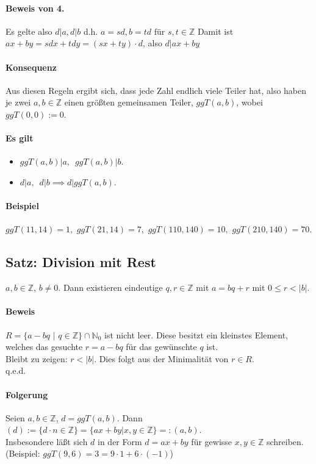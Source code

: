 \documentclass[14pt,a4paper]{article}
\newcommand{\Z}{\ensuremath{\mathbb{Z}}}
\begin{document}
			\paragraph{Beweis von 4.}
				Es gelte also $d|a, d|b$ d.h. $a=sd, b=td \text{ für } s,t \in \mathbb{Z}$
				Damit ist $ax+by=sdx+tdy=(sx+ty)\cdot d$, also $d|ax+by$

			\paragraph{Konsequenz}
				Aus diesen Regeln ergibt sich, dass jede Zahl endlich viele Teiler hat, also haben je zwei $a,b \in \mathbb{Z}$ einen größten gemeinsamen Teiler, $ggT(a,b)$, wobei $ggT(0,0) := 0$.

			\paragraph{Es gilt}
				\begin{itemize}
					\item$ggT(a,b) | a,\,\,\, ggT(a,b) | b$.
					\item $d|a,\,\,\,d|b \implies d|ggT(a,b)$.
				\end{itemize}

			\paragraph{Beispiel}
				$ggT(11,14) = 1,\,\, ggT(21,14) = 7,\,\, ggT(110, 140) = 10,\,\, ggT(210, 140) = 70$.

		\subsection{Satz: Division mit Rest}
			$ a,b \in \mathbb{Z},\,b \neq 0 $. Dann existieren eindeutige $ q,r \in \mathbb{Z} $ mit $ a = bq + r $ mit $ 0 \leq r < |b| $.
			\paragraph{Beweis}
				$ R = \{ a - bq\,\,|\,\,q \in \mathbb{Z} \} \cap \mathbb{N}_0 $ ist nicht leer.
				Diese besitzt ein kleinstes Element, welches das gesuchte $ r = a - bq $ für das gewünschte $q$ ist.\\
				Bleibt zu zeigen: $r < |b|$. Dies folgt aus der Minimalität von $r \in R$. \\
				q.e.d.
			\paragraph{Folgerung}
				Seien $ a,b \in \Z$, $d=ggT(a,b) $. Dann $ (d) := \{d \cdot n \in \Z\} = \{ax + by | x,y \in \Z \} =: (a,b) $. \\
				Insbesondere läßt sich $d$ in der Form $d = ax + by$ für gewisse $ x,y \in \Z$ schreiben.
				(Beispiel: $ ggT(9, 6) = 3 = 9 \cdot 1 + 6 \cdot (-1) $)
\end{document}

